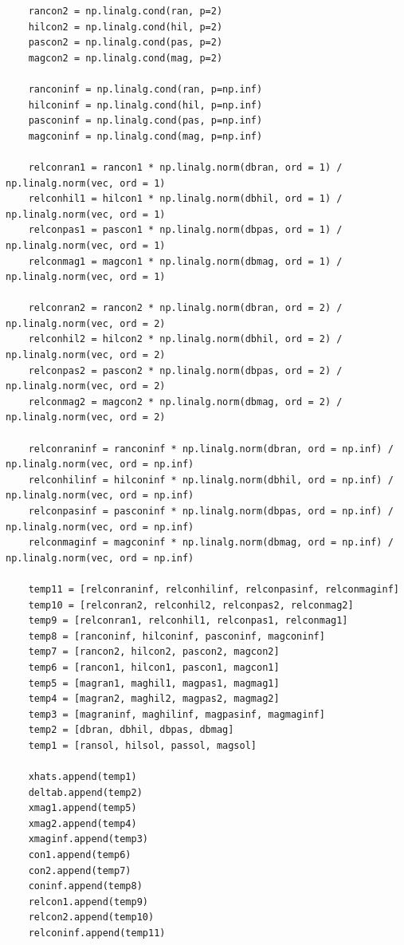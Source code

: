 \begin{solution}
\begin{lstlisting}
    rancon2 = np.linalg.cond(ran, p=2)
    hilcon2 = np.linalg.cond(hil, p=2)
    pascon2 = np.linalg.cond(pas, p=2)
    magcon2 = np.linalg.cond(mag, p=2)

    ranconinf = np.linalg.cond(ran, p=np.inf)
    hilconinf = np.linalg.cond(hil, p=np.inf)
    pasconinf = np.linalg.cond(pas, p=np.inf)
    magconinf = np.linalg.cond(mag, p=np.inf)
    
    relconran1 = rancon1 * np.linalg.norm(dbran, ord = 1) / np.linalg.norm(vec, ord = 1)
    relconhil1 = hilcon1 * np.linalg.norm(dbhil, ord = 1) / np.linalg.norm(vec, ord = 1)
    relconpas1 = pascon1 * np.linalg.norm(dbpas, ord = 1) / np.linalg.norm(vec, ord = 1)
    relconmag1 = magcon1 * np.linalg.norm(dbmag, ord = 1) / np.linalg.norm(vec, ord = 1)
    
    relconran2 = rancon2 * np.linalg.norm(dbran, ord = 2) / np.linalg.norm(vec, ord = 2)
    relconhil2 = hilcon2 * np.linalg.norm(dbhil, ord = 2) / np.linalg.norm(vec, ord = 2)
    relconpas2 = pascon2 * np.linalg.norm(dbpas, ord = 2) / np.linalg.norm(vec, ord = 2)
    relconmag2 = magcon2 * np.linalg.norm(dbmag, ord = 2) / np.linalg.norm(vec, ord = 2)
    
    relconraninf = ranconinf * np.linalg.norm(dbran, ord = np.inf) / np.linalg.norm(vec, ord = np.inf)
    relconhilinf = hilconinf * np.linalg.norm(dbhil, ord = np.inf) / np.linalg.norm(vec, ord = np.inf)
    relconpasinf = pasconinf * np.linalg.norm(dbpas, ord = np.inf) / np.linalg.norm(vec, ord = np.inf)
    relconmaginf = magconinf * np.linalg.norm(dbmag, ord = np.inf) / np.linalg.norm(vec, ord = np.inf)
    
    temp11 = [relconraninf, relconhilinf, relconpasinf, relconmaginf]
    temp10 = [relconran2, relconhil2, relconpas2, relconmag2]
    temp9 = [relconran1, relconhil1, relconpas1, relconmag1]
    temp8 = [ranconinf, hilconinf, pasconinf, magconinf]
    temp7 = [rancon2, hilcon2, pascon2, magcon2]
    temp6 = [rancon1, hilcon1, pascon1, magcon1]
    temp5 = [magran1, maghil1, magpas1, magmag1]
    temp4 = [magran2, maghil2, magpas2, magmag2]
    temp3 = [magraninf, maghilinf, magpasinf, magmaginf]
    temp2 = [dbran, dbhil, dbpas, dbmag]
    temp1 = [ransol, hilsol, passol, magsol]
    
    xhats.append(temp1)
    deltab.append(temp2)
    xmag1.append(temp5)
    xmag2.append(temp4)
    xmaginf.append(temp3)
    con1.append(temp6)
    con2.append(temp7)
    coninf.append(temp8)
    relcon1.append(temp9)
    relcon2.append(temp10)
    relconinf.append(temp11)
     \end{lstlisting}


\end{solution}
